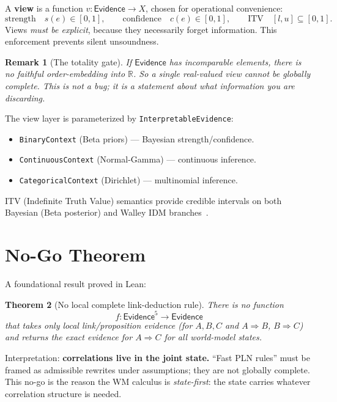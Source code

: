 \documentclass[]{article}
\newtheorem{theorem}{Theorem}
\newtheorem{remark}[theorem]{Remark}
\newcommand{\code}[1]{\texttt{#1}}
\newcommand{\Evidence}{\mathsf{Evidence}}
\begin{document}
A \textbf{view} is a function $v:\Evidence\to X$, chosen for operational
convenience:
\[
  \text{strength}\quad s(e) \in [0,1], \qquad
  \text{confidence}\quad c(e) \in [0,1], \qquad
  \text{ITV}\quad [l,u] \subseteq [0,1].
\]
Views \emph{must be explicit}, because they necessarily forget information.
This enforcement prevents silent unsoundness.

\begin{remark}[The totality gate]
If $\Evidence$ has incomparable elements, there is no faithful
order-embedding into $\mathbb{R}$. So a single real-valued view cannot be
globally complete. This is not a bug; it is a statement about what
information you are discarding.
\end{remark}

The view layer is parameterized by \code{InterpretableEvidence}:
\begin{itemize}[leftmargin=2em]
\item \code{BinaryContext} (Beta priors) --- Bayesian strength/confidence.
\item \code{ContinuousContext} (Normal-Gamma) --- continuous inference.
\item \code{CategoricalContext} (Dirichlet) --- multinomial inference.
\end{itemize}

ITV (Indefinite Truth Value) semantics provide credible intervals on both
Bayesian (Beta posterior) and Walley IDM
branches~\cite{Walley1996BagOfMarbles}.


\section{No-Go Theorem}
\label{sec:nogo}

A foundational result proved in Lean:

\begin{theorem}[No local complete link-deduction rule]
\label{thm:nogo}
There is no function
\[
  f:\Evidence^5\to \Evidence
\]
that takes only local link/proposition evidence (for $A,B,C$ and
$A\Rightarrow B$, $B\Rightarrow C$) and returns the exact evidence for
$A\Rightarrow C$ for all world-model states.
\end{theorem}

\noindent
Interpretation: \textbf{correlations live in the joint state.} ``Fast PLN
rules'' must be framed as admissible rewrites under assumptions; they are
not globally complete. This no-go is the reason the WM calculus is
\emph{state-first}: the state carries whatever correlation structure is
needed.
\end{document}
